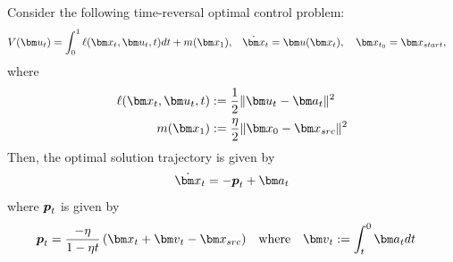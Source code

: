 \begin{lemma}\label{lem:oc}
Consider the following time-reversal optimal control problem:
\begin{align}
 V(\vu_t) =  \int_{0}^1  \ell (\vx_t,\vu_t,t) dt + m (\vx_1),  & \quad \dot\vx_t = \vu(\vx_t) ,\quad \vx_{t_0} = \vx_{start},
\end{align}
where
\begin{align}
\ell (\vx_t,\vu_t,t) & := \frac{1}{2}\|\vu_t-\va_t \|^2  \\
m(\vx_1) &:= \frac{\eta}{2}\|\vx_0-\vx_{src}\|^2
\end{align}
Then, the optimal solution trajectory is given by
\begin{align}
\dot \vx_t = -\pb_t +\va_t 
\end{align}
where ${\boldsymbol p}_t$ is given by
\begin{align}
\pb_t =   \frac{-\eta}{1-\eta t} \left(\vx_{t}+\vv_{t} -\vx_{src} \right) 
&\quad \mbox{where} \quad
 \vv_t:= \int_t^0 \va_t dt 
\end{align}
\end{lemma}
